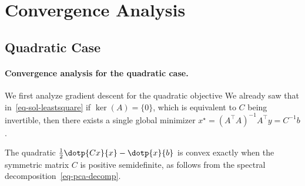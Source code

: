 \section{Convergence Analysis}


                                                                                  
\subsection{Quadratic Case}

   
\paragraph{Convergence analysis for the quadratic case.}

We first analyze gradient descent for the quadratic objective
We already saw that in~\eqref{eq-sol-leastsquare} if $\ker(A)=\{0\}$, which is equivalent to $C$ being invertible, then there exists a single global minimizer $x^\star = (A^\top A)^{-1} A^\top y =C^{-1}b$.

The quadratic $\frac{1}{2} \dotp{Cx}{x} - \dotp{x}{b}$ is convex exactly when the symmetric matrix $C$ is positive semidefinite, as follows from the spectral decomposition~\eqref{eq-pca-decomp}.

